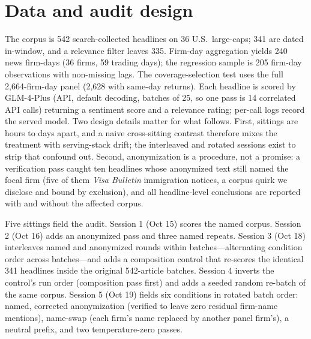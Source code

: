\documentclass[11pt]{article}
\begin{document}
\section{Data and audit design}

The corpus is 542 search-collected headlines on 36 U.S.\ large-caps; 341 are dated in-window, and a relevance filter leaves 335. Firm-day aggregation yields 240 news firm-days (36 firms, 59 trading days); the regression sample is 205 firm-day observations with non-missing lags. The coverage-selection test uses the full 2,664-firm-day panel (2,628 with same-day returns). Each headline is scored by GLM-4-Plus (API, default decoding, batches of 25, so one pass is 14 correlated API calls) returning a sentiment score and a relevance rating; per-call logs record the served model. Two design details matter for what follows. First, sittings are hours to days apart, and a naive cross-sitting contrast therefore mixes the treatment with serving-stack drift; the interleaved and rotated sessions exist to strip that confound out. Second, anonymization is a procedure, not a promise: a verification pass caught ten headlines whose anonymized text still named the focal firm (five of them \emph{Visa Bulletin} immigration notices, a corpus quirk we disclose and bound by exclusion), and all headline-level conclusions are reported with and without the affected corpus.

Five sittings field the audit. Session 1 (Oct 15) scores the named corpus. Session 2 (Oct 16) adds an anonymized pass and three named repeats. Session 3 (Oct 18) interleaves named and anonymized rounds within batches---alternating condition order across batches---and adds a composition control that re-scores the identical 341 headlines inside the original 542-article batches. Session 4 inverts the control's run order (composition pass first) and adds a seeded random re-batch of the same corpus. Session 5 (Oct 19) fields six conditions in rotated batch order: named, corrected anonymization (verified to leave zero residual firm-name mentions), name-swap (each firm's name replaced by another panel firm's), a neutral prefix, and two temperature-zero passes.
\end{document}
